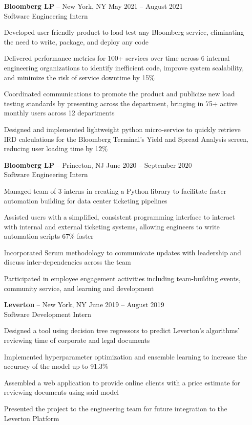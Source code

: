 \documentclass{article}
\newcommand{\employer}[4]{{
\vspace*{2pt}%
\textbf{#1} #2 \hfill #3\\ #4 \vspace*{2pt}}
}
\renewcommand{\labelitemii}{
$\vcenter{\hbox{\tiny$\bullet$}}$\hspace*{-3pt}
}
\newenvironment{bullet-list-minor}{
\begin{list}{\labelitemii}{\setlength\leftmargin{15pt} 
\topsep 0pt \itemsep -2pt}}{\vspace*{4pt}\end{list}
}
\begin{document}
    \employer{Bloomberg LP}
    {-- New York, NY}{May 2021 -- August 2021}{Software Engineering Intern}
	\begin{bullet-list-minor}
	\item Developed user-friendly product to load test any Bloomberg service, eliminating the need to write, package, and deploy any code
	\item Delivered performance metrics for 100+ services over time across 6 internal engineering organizations to identify inefficient code, improve system scalability, and minimize the risk of service downtime by 15\%
	\item Coordinated communications to promote the product and publicize new load testing standards by presenting across the department, bringing in 75+ active monthly users across 12 departments
	\item Designed and implemented lightweight python micro-service to quickly retrieve IRD calculations for the Bloomberg Terminal's Yield and Spread Analysis screen, reducing user loading time by 12\%
    \end{bullet-list-minor}

    \employer{Bloomberg LP}
    {-- Princeton, NJ}{June 2020 -- September 2020}{Software Engineering Intern}
	\begin{bullet-list-minor}
	\item Managed team of 3 interns in creating a Python library to facilitate faster automation building for data center ticketing pipelines
	\item Assisted users with a simplified, consistent programming interface to interact with internal and external ticketing systems, allowing engineers to write automation scripts 67\% faster
	\item Incorporated Scrum methodology to communicate updates with leadership and discuss inter-dependencies across the team
	\item Participated in employee engagement activities including team-building events, community service, and learning and development
    \end{bullet-list-minor}

    \employer{Leverton}{-- New York, NY}{June 2019 -- August 2019}{Software Development Intern}
	\begin{bullet-list-minor}
	\item Designed a tool using decision tree regressors to predict Leverton's algorithms' reviewing time of corporate and legal documents
	\item Implemented hyperparameter optimization and ensemble learning to increase the accuracy of the model up to 91.3\%
	\item Assembled a web application to provide online clients with a price estimate for reviewing documents using said model
	\item Presented the project to the engineering team for future integration to the Leverton Platform

    \end{bullet-list-minor}
\end{document}
